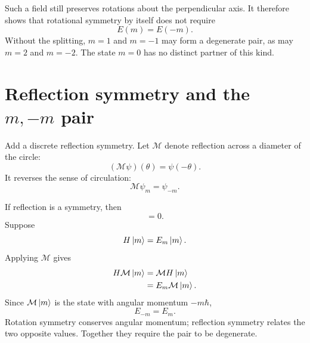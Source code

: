 Such a field still preserves rotations about the perpendicular axis. It therefore shows that rotational symmetry by itself does not require
\begin{equation}
E(m)=E(-m).
\end{equation}
Without the splitting, \(m=1\) and \(m=-1\) may form a degenerate pair, as may \(m=2\) and \(m=-2\). The state \(m=0\) has no distinct partner of this kind.

\section{Reflection symmetry and the \texorpdfstring{\(m,-m\)}{m, -m} pair}

Add a discrete reflection symmetry. Let \(\mathcal M\) denote reflection across a diameter of the circle:
\begin{equation}
(\mathcal M\psi)(\theta)=\psi(-\theta).
\end{equation}
It reverses the sense of circulation:
\begin{equation}
\mathcal M\psi_m=\psi_{-m}.
\end{equation}

If reflection is a symmetry, then
\begin{equation}
[\mathcal M,H]=0.
\end{equation}
Suppose
\begin{equation}
H\left\lvert m\right\rangle=E_m\left\lvert m\right\rangle.
\end{equation}
Applying \(\mathcal M\) gives
\begin{align}
H\mathcal M\left\lvert m\right\rangle
&=\mathcal M H\left\lvert m\right\rangle\\
&=E_m\mathcal M\left\lvert m\right\rangle.
\end{align}
Since \(\mathcal M\left\lvert m\right\rangle\) is the state with angular momentum \(-m\hbar\),
\begin{equation}
E_{-m}=E_m.
\end{equation}
Rotation symmetry conserves angular momentum; reflection symmetry relates the two opposite values. Together they require the pair to be degenerate.

\begin{classroomqa}
\end{classroomqa}

